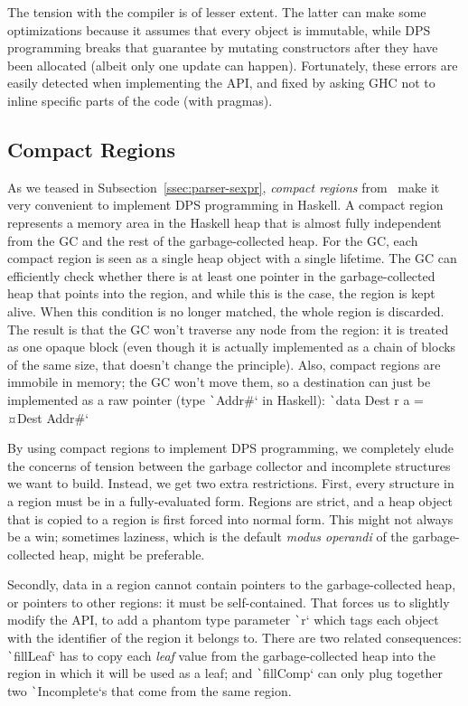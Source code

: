 \documentclass[english]{jflart}
\begin{document}
The tension with the compiler is of lesser extent. The latter can make some optimizations because it assumes that every object is immutable, while DPS programming breaks that guarantee by mutating constructors after they have been allocated (albeit only one update can happen). Fortunately, these errors are easily detected when implementing the API, and fixed by asking GHC not to inline specific parts of the code (with pragmas).

\subsection{Compact Regions}\label{ssec:impl-compact-regions}

As we teased in Subsection~\ref{ssec:parser-sexpr}, \emph{compact regions} from~\cite{yang_efficient_2015} make it very convenient to implement DPS programming in 
Haskell. A compact region represents a memory area in the Haskell heap that is almost fully independent from the GC and the rest of the garbage-collected heap. For the GC, each compact region is seen as a single heap object with a single lifetime. The GC can efficiently check whether there is at least one pointer in the garbage-collected heap that points into the region, and while this is the case, the region is kept alive. When this condition is no longer matched, the whole region is discarded. The result is that the GC won't traverse any node from the region: it is treated as one opaque block (even though it is actually implemented as a chain of blocks of the same size, that doesn't change the principle). Also, compact regions are immobile in memory; the GC won't move them, so a destination can just be implemented as a raw pointer (type \texttt`Addr#` in Haskell): \texttt`data Dest r a = ¤Dest Addr#`

By using compact regions to implement DPS programming, we completely elude the concerns of tension between the garbage collector and incomplete structures we want to build. Instead, we get two extra restrictions. First, every structure in a region must be in a fully-evaluated form. Regions are strict, and a heap object that is copied to a region is first forced into normal form. This might not always be a win; sometimes laziness, which is the default \emph{modus operandi} of the garbage-collected heap, might be preferable.

Secondly, data in a region cannot contain pointers to the garbage-collected heap, or pointers to other regions: it must be self-contained. That forces us to slightly modify the API, to add a phantom type parameter \texttt`r` which tags each object with the identifier of the region it belongs to. There are two related consequences: \texttt`fillLeaf` has to copy each \emph{leaf} value from the garbage-collected heap into the region in which it will be used as a leaf; and \texttt`fillComp` can only plug together two \texttt`Incomplete`s that come from the same region.
\end{document}
